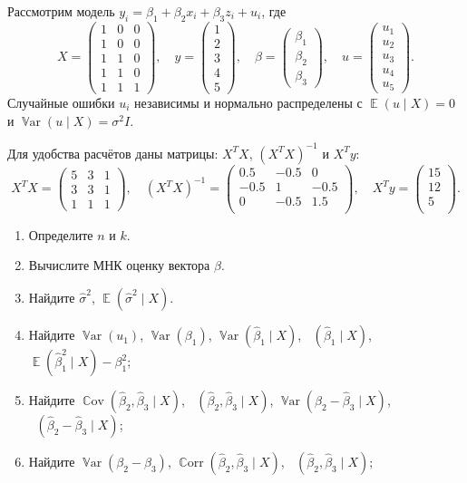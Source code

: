 \documentclass[12pt]{article}
\DeclareMathOperator{\Cov}{\mathbb{C}ov}
\DeclareMathOperator{\Corr}{\mathbb{C}orr}
\DeclareMathOperator{\Var}{\mathbb{V}ar}
\DeclareMathOperator{\hVar}{\widehat{\Var}}
\DeclareMathOperator{\hCov}{\widehat{\Cov}}
\DeclareMathOperator{\hCorr}{\widehat{\Corr}}
\DeclareMathOperator{\E}{\mathbb{E}}
\newcommand{\hb}{\hat{\beta}}
\newcommand{\hs}{\hat{\sigma}}
\begin{document}
\begin{problem}
Рассмотрим модель $y_i = \beta_1 + \beta_2 x_i + \beta_3 z_i + u_i$, 
 где
\[
X = \begin{pmatrix} 
  1 & 0 & 0 \\ 
  1 & 0 & 0 \\ 
  1 & 1 & 0 \\ 
  1 & 1 & 0 \\ 
  1 & 1 & 1 
\end{pmatrix}, \quad
y = \begin{pmatrix} 1 \\ 2 \\ 3 \\ 4 \\ 5 \end{pmatrix}, \quad
\beta = \begin{pmatrix} \beta_1 \\ \beta_2 \\ \beta_3 \end{pmatrix}, \quad
u = \begin{pmatrix} u_1 \\ u_2 \\ u_3 \\ u_4 \\ u_5  \end{pmatrix}.
\]
Случайные ошибки $u_i$ независимы и нормально распределены с
$\E(u \mid X) = 0$ и $\Var(u \mid X) = \sigma^2 I$. 

Для удобства расчётов даны матрицы: $X^TX$, $(X^TX)^{-1}$ и $X^Ty$:
\[
X^TX = \begin{pmatrix} 
  5 & 3 & 1 \\ 
  3 & 3 & 1\\ 
  1 & 1 & 1 
\end{pmatrix}, \quad
(X^T X)^{-1} =  \begin{pmatrix}
  0.5 & -0.5 & 0 \\
  -0.5 & 1 & -0.5 \\
  0 & -0.5 & 1.5 \\
  \end{pmatrix},\quad
X^Ty =  \begin{pmatrix}
  15 \\
  12 \\
  5 \\
  \end{pmatrix}.
\]


\begin{enumerate}
\item Определите $n$ и $k$.
\item Вычислите МНК оценку вектора $\beta$.
\item Найдите $\hs^2$, $\E (\hs^2 \mid X)$.
\item Найдите  $\Var (u_1)$, $\Var (\beta_1)$, $\Var (\hb_1 \mid X)$, $\hVar(\hb_1 \mid X)$, $\E (\hb_1^2 \mid X) - \beta_1^2$;
\item Найдите  $\Cov (\hb_2, \hb_3 \mid X)$, $\hCov(\hb_2, \hb_3 \mid X)$, $\Var (\hb_2 - \hb_3 \mid X)$, $\hVar(\hb_2 - \hb_3 \mid X)$;
\item Найдите  $\Var (\beta_2 - \beta_3)$, $\Corr (\hb_2, \hb_3 \mid X)$, $\hCorr(\hb_2, \hb_3 \mid X)$;
\end{enumerate}



\end{problem}
\end{document}
